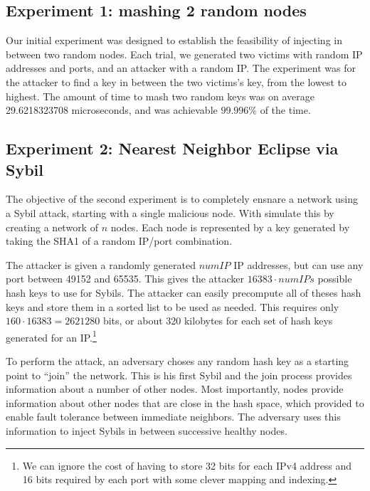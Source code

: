 \documentclass[a4paper]{article}
\begin{document}






\subsection{Experiment 1: mashing 2 random nodes}
Our initial experiment was designed to establish the feasibility of injecting in between two random nodes.
Each trial, we generated two victims with random IP addresses and ports, and an attacker with a random IP.
The experiment was for the attacker to find a key in between the two victims's key, from the lowest to highest.
The amount of time to mash two random keys was on average 29.6218323708 microseconds, and was achievable $ 99.996\%$ of the time.



\subsection{Experiment 2:  Nearest Neighbor Eclipse via Sybil}
The objective of the second experiment is to completely ensnare a network using a Sybil attack, starting with a single malicious node.
With simulate this by creating a network of $n$ nodes.  
Each node is represented by a key generated by taking the SHA1 of a random IP/port combination.

The attacker is given a randomly generated $numIP$ IP addresses, but can use any port between 49152 and 65535.
This gives the attacker $ 16383 \cdot numIPs $ possible hash keys to use for Sybils.
The attacker can easily precompute all of theses hash keys and store them in a sorted list to be used as needed.
This requires only $160  \cdot 16383 = 2621280$  bits, or about 320 kilobytes for each set of hash keys generated for an IP.\footnote{We can ignore the cost of having to store 32 bits for each IPv4 address and 16 bits required by each port with some clever mapping and indexing.}

To perform the attack, an adversary choses any random hash key as a starting point to ``join'' the network.
This is his first Sybil and the join process provides information about a number of other nodes.
Most importantly,  nodes provide information about other nodes that are close in the hash space, which provided to enable fault tolerance between immediate neighbors.
The adversary uses this information to inject Sybils in between successive healthy nodes.
\end{document}
